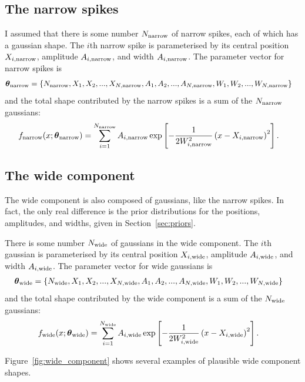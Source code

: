 \documentclass[a4paper, 12pt]{elsarticle}
\newcommand{\params}{\boldsymbol{\theta}}
\newcommand{\x}{x}
\begin{document}
\subsection{The narrow spikes}
I assumed that there is some number $N_{\rm narrow}$ of narrow spikes,
each of which has a gaussian shape. The $i$th narrow spike is parameterised
by its central position $X_{i, \rm narrow}$,
amplitude $A_{i, \rm narrow}$, and width $A_{i, \rm narrow}$.
The parameter vector for narrow spikes is
\begin{align}
\params_{\rm narrow} &=
  \{N_{\rm narrow}, X_1, X_2, ..., X_{N, \rm narrow},
    A_1, A_2, ..., A_{N, \rm narrow},
    W_1, W_2, ..., W_{N, \rm narrow}\}
\end{align}
and the total shape contributed by the
narrow spikes is a sum of the $N_{\rm narrow}$ gaussians:
\begin{align}
f_{\rm narrow}(\x; \params_{\rm narrow}) &=
    \sum_{i=1}^{N_{\rm narrow}} A_{i, \rm narrow}
 \exp\left[-\frac{1}{2W_{i, \rm narrow}^2}\left(x - X_{i, \rm narrow}\right)^2\right].
\end{align}

\subsection{The wide component}
The wide component is also composed of gaussians, like the narrow spikes.
In fact, the only real difference is the prior distributions for the positions,
amplitudes, and widths, given in Section~\ref{sec:priors}.

There is some number $N_{\rm wide}$ of gaussians in the wide component.
The $i$th gaussian is parameterised
by its central position $X_{i, \rm wide}$,
amplitude $A_{i, \rm wide}$, and width $A_{i, \rm wide}$.
The parameter vector for wide gaussians is
\begin{align}
\params_{\rm wide} &=
  \{N_{\rm wide}, X_1, X_2, ..., X_{N, \rm wide},
    A_1, A_2, ..., A_{N, \rm wide},
    W_1, W_2, ..., W_{N, \rm wide}\}
\end{align}
and the total shape contributed by the
wide component is a sum of the $N_{\rm wide}$ gaussians:
\begin{align}
f_{\rm wide}(\x; \params_{\rm wide}) &=
    \sum_{i=1}^{N_{\rm wide}} A_{i, \rm wide}
 \exp\left[-\frac{1}{2W_{i, \rm wide}^2}\left(x - X_{i, \rm wide}\right)^2\right].
\end{align}

Figure~\ref{fig:wide_component} shows several examples of plausible
wide component shapes.
\end{document}
